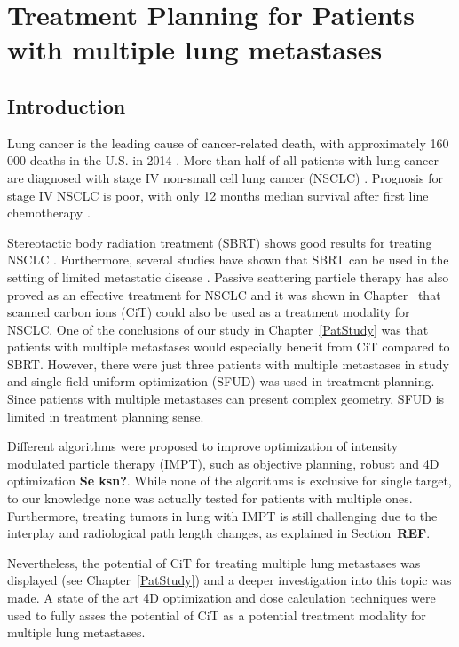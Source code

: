 \documentclass[type=dr, dr=rernat, accentcolor=tud7b,colorbacktitle, bigchapter, openright, twoside, 12pt ]{tudthesis}
\begin{document}
\chapter{Treatment Planning for Patients with multiple lung metastases}
\label{chapter:vmm}
\minitoc

\section{Introduction}

Lung cancer is the leading cause of cancer-related death, with approximately 160 000 deaths in the U.S. in 2014 \cite{Siegel2014}. More than half of all patients with lung cancer are diagnosed with stage IV non-small cell lung cancer (NSCLC) \cite{Ramalingam2008, Iyengar2014}.
Prognosis for stage IV NSCLC is poor, with only 12 months median survival after first line chemotherapy \cite{Socinski2013}. 

Stereotactic body radiation treatment (SBRT) shows good results for treating NSCLC \cite{Baumann2009, Fakiris2009, Grutters2010, Ricardi2010, Timmerman2010, Greco2011}. Furthermore, several studies have shown that SBRT can be used in the setting of limited metastatic disease \cite{Rusthoven2009. Villaruz2012, Salama2012, Iyengar2014}. Passive scattering particle therapy has also proved as an effective treatment for NSCLC \cite{Grutters2010, Tsujii2012} and it was shown in Chapter~\cite{PatStudy} that scanned carbon ions (CiT) could also be used as a treatment modality for NSCLC. One of the conclusions of our study in Chapter~\ref{PatStudy} was that patients with multiple metastases would especially benefit from CiT compared to SBRT. However, there were just three patients with multiple metastases in study and single-field uniform optimization (SFUD) was used in treatment planning. Since patients with multiple metastases can present complex geometry, SFUD is limited in treatment planning sense.

Different algorithms were proposed to improve optimization of intensity modulated particle therapy (IMPT), such as objective planning, robust and 4D optimization \textbf{Se ksn?}. While none of the algorithms is exclusive for single target, to our knowledge none was actually
tested for patients with multiple ones. Furthermore, treating tumors in lung with IMPT is still challenging due to the interplay and radiological path length changes, as explained in Section~\textbf{REF}.

Nevertheless, the potential of CiT for treating multiple lung metastases was displayed (see Chapter~\ref{PatStudy}) and a deeper investigation into this topic was made. A state of the art 4D optimization and dose calculation techniques were used to fully asses the potential of CiT as a potential treatment modality for multiple lung metastases.
\end{document}
